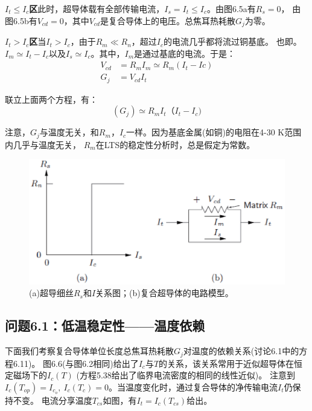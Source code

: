 \textbf{$I_t\le I_c$区}\quad 此时，超导体载有全部传输电流，$I_s=I_t\le I_c$。由图6.5a有$R_s=0$，
由图6.5b有$V_{cd}=0$，其中$V_{cd}$是复合导体上的电压。总焦耳热耗散$G_j$为零。

\textbf{$I_t>I_c$区}\quad 当$I_t>I_c$，由于$R_m\ll R_n$，超过$I_c$的电流几乎都将流过铜基底。
也即。$I_m\simeq I_t-I_c$以及$I_s\simeq I_c$。其中，$I_m$是通过基底的电流。于是：
\begin{subequations}
	\begin{align}
	V_{cd}&=R_mI_m\simeq R_m{(I_t-Ic)}\\
	G_{j}&=V_{cd}I_t
	\end{align}
\end{subequations}

联立上面两个方程，有：
\begin{equation}%
{(G_j)}\simeq R_{m}I_{t}{（I_t-I_c)}
\end{equation}

注意，$G_j$与温度无关，和$R_m，I_c$一样。因为基底金属(如铜)的电阻在4-30 K范围内几乎与温度无关，
$R_m$在LTS的稳定性分析时，总是假定为常数。
\begin{figure}[htbp]
	\centering
	\includegraphics[scale=0.7]{chpt6/figs/fig6.5.eps}
	\caption{(a)超导细丝$R_s$和$I$关系图；(b)复合超导体的电路模型。}
\end{figure}

\subsection{问题6.1：低温稳定性——温度依赖}
下面我们考察复合导体单位长度总焦耳热耗散$G_j$对温度的依赖关系(讨论6.1中的方程6.11)。
图6.6(与图6.2相同)给出了$I_c$与$T$的关系，该关系常用于近似超导体在恒定磁场下的$I_c(T)$
(方程5.38给出了临界电流密度的相同的线性近似)。
注意到$I_c(T_{op})=I_{c_o},\ I_c(T_c)=0$。当温度变化时，通过复合导体的净传输电流$I_t$仍保持不变。
电流分享温度$T_{cs}$如图，有$I_t=I_c(T_{cs})$给出。

